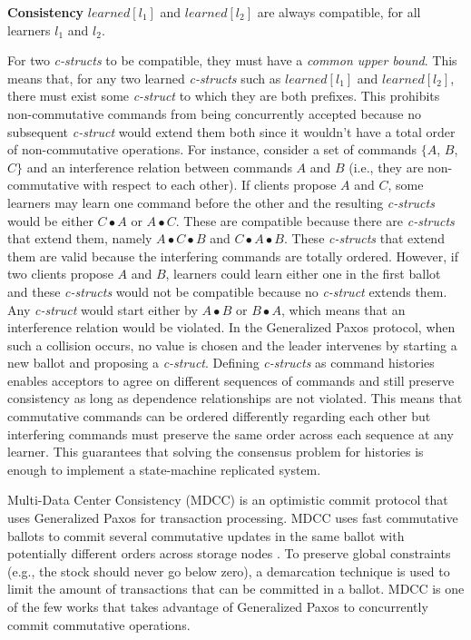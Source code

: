 \textbf{Consistency} $learned[l_1]$ and $learned[l_2]$ are always compatible, for all learners $l_1$ and $l_2$. \par
For two \textit{c-structs} to be compatible, they must have a \textit{common upper bound}. This means that, for any two learned \textit{c-structs} such as $learned[l_1]$ and $learned[l_2]$, there must exist some \textit{c-struct} to which they are both prefixes. This prohibits non-commutative commands from being concurrently accepted because no subsequent \textit{c-struct} would extend them both since it wouldn't have a total order of non-commutative operations. For instance, consider a set of commands $\lbrace A$, $B$, $C\rbrace$ and an interference relation between commands $A$ and $B$ (i.e., they are non-commutative with respect to each other). If clients propose $A$ and $C$, some learners may learn one command before the other and the resulting \textit{c-structs} would be either $C \bullet A$ or $A \bullet C$. These are compatible because there are \textit{c-structs} that extend them, namely $A \bullet C \bullet B$ and $C \bullet A \bullet B$. These \textit{c-structs} that extend them are valid because the interfering commands are totally ordered. However, if two clients propose $A$ and $B$, learners could learn either one in the first ballot and these \textit{c-structs} would not be compatible because no \textit{c-struct} extends them. Any \textit{c-struct} would start either by $A \bullet B$ or $B \bullet A$, which means that an interference relation would be violated. In the Generalized Paxos protocol, when such a collision occurs, no value is chosen and the leader intervenes by starting a new ballot and proposing a \textit{c-struct}. Defining \textit{c-structs} as command histories enables acceptors to agree on different sequences of commands and still preserve consistency as long as dependence relationships are not violated. This means that commutative commands can be ordered differently regarding each other but interfering commands must preserve the same order across each sequence at any learner. This guarantees that solving the consensus problem for histories is enough to implement a state-machine replicated system. \par
Multi-Data Center Consistency (MDCC) is an optimistic commit protocol that uses Generalized Paxos for transaction processing. MDCC uses fast commutative ballots to commit several commutative updates in the same ballot with potentially different orders across storage nodes \cite{Kraska2013}. To preserve global constraints (e.g., the stock should never go below zero), a demarcation technique is used to limit the amount of transactions that can be committed in a ballot. MDCC is one of the few works that takes advantage of Generalized Paxos to concurrently commit commutative operations.\par
